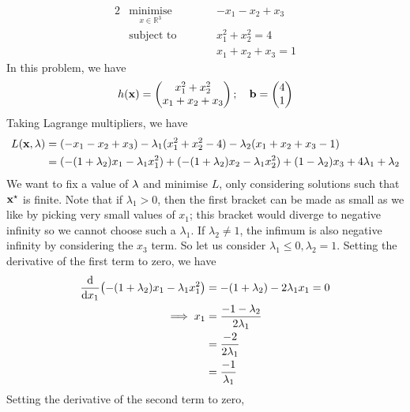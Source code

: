 \begin{example}
	\begin{alignat*}{2}
		 & \underset{x \in \mathbb R^3}{\text{minimise}} & \qquad & -x_1 -x_2 + x_3     \\
		 & \text{subject to}                             &        & x_1^2 + x_2^2 = 4   \\
		 &                                               &        & x_1 + x_2 + x_3 = 1
	\end{alignat*}
	In this problem, we have
	\[
		h(\vb x) = \begin{pmatrix}
			x_1^2 + x_2^2 \\ x_1 + x_2 + x_3
		\end{pmatrix};\quad \vb b = \begin{pmatrix}
			4 \\ 1
		\end{pmatrix}
	\]
	Taking Lagrange multipliers, we have
	\begin{align*}
		L(\vb x, \vb\lambda) & = (-x_1 - x_2 + x_3) - \lambda_1 (x_1^2 + x_2^2 - 4) - \lambda_2(x_1+x_2 + x_3 - 1)                                               \\
		                     & = (-(1+\lambda_2) x_1 - \lambda_1 x_1^2) + (-(1 + \lambda_2)x_2 - \lambda_1 x_2^2) + (1 - \lambda_2)x_3 + 4 \lambda_1 + \lambda_2
	\end{align*}
	We want to fix a value of \(\vb \lambda\) and minimise \(L\), only considering solutions such that \(\vb x^\star\) is finite.
	Note that if \(\lambda_1 > 0\), then the first bracket can be made as small as we like by picking very small values of \(x_1\); this bracket would diverge to negative infinity so we cannot choose such a \(\lambda_1\).
	If \(\lambda_2 \neq 1\), the infimum is also negative infinity by considering the \(x_3\) term.
	So let us consider \(\lambda_1 \leq 0, \lambda_2 = 1\).
	Setting the derivative of the first term to zero, we have
	\begin{align*}
		\dv{x_1} (-(1+\lambda_2) x_1 - \lambda_1 x_1^2) & = -(1+\lambda_2) - 2 \lambda_1 x_1 = 0 \\
		\implies x_1                                    & = \frac{-1 - \lambda_2}{2\lambda_1}    \\
		                                                & = \frac{-2}{2\lambda_1}                \\
		                                                & = \frac{-1}{\lambda_1}
	\end{align*}
	Setting the derivative of the second term to zero,

\end{example}

